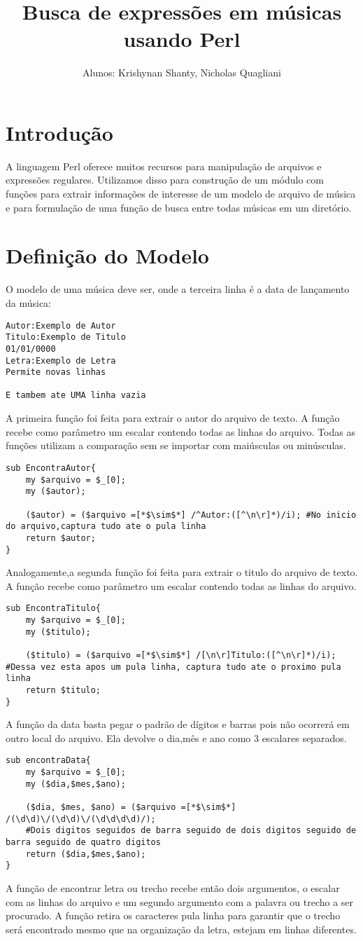 \documentclass[12pt]{article}
\title{Busca de expressões em músicas usando Perl}
\author{Alunos: Krishynan Shanty, Nicholas Quagliani}
\begin{document}
\maketitle

\section{Introdução}
A linguagem Perl oferece muitos recursos para manipulação de arquivos e expressões regulares. Utilizamos disso para construção de um módulo com funções para extrair informações de interesse de um modelo de arquivo de música e para formulação de uma função de busca entre todas músicas em um diretório.
\section{Definição do Modelo}
O modelo de uma música deve ser, onde a terceira linha é a data de lançamento da música:
\begin{lstlisting}
Autor:Exemplo de Autor
Titulo:Exemplo de Titulo
01/01/0000
Letra:Exemplo de Letra
Permite novas linhas

E tambem ate UMA linha vazia
\end{lstlisting}
A primeira função foi feita para extrair o autor do arquivo de texto. A função recebe como parâmetro um escalar contendo todas as linhas do arquivo. Todas as funções utilizam a comparação sem se importar com maiúsculas ou minúsculas.
\begin{lstlisting}
sub EncontraAutor{
	my $arquivo = $_[0];
	my ($autor);
	
	($autor) = ($arquivo =[*$\sim$*] /^Autor:([^\n\r]*)/i); #No inicio do arquivo,captura tudo ate o pula linha
	return $autor;
}
\end{lstlisting}
Analogamente,a segunda função foi feita para extrair o titulo do arquivo de texto. A função recebe como parâmetro um escalar contendo todas as linhas do arquivo. \\
\begin{lstlisting}
sub EncontraTitulo{
	my $arquivo = $_[0];
	my ($titulo);
	
	($titulo) = ($arquivo =[*$\sim$*] /[\n\r]Titulo:([^\n\r]*)/i); #Dessa vez esta apos um pula linha, captura tudo ate o proximo pula linha
	return $titulo;
}
\end{lstlisting}
A função da data basta pegar o padrão de dígitos e barras pois não ocorrerá em outro local do arquivo. Ela devolve o dia,mês e ano como 3 escalares separados.
\begin{lstlisting}
sub encontraData{
	my $arquivo = $_[0];
	my ($dia,$mes,$ano);
	
	($dia, $mes, $ano) = ($arquivo =[*$\sim$*] /(\d\d)\/(\d\d)\/(\d\d\d\d)/);
	#Dois digitos seguidos de barra seguido de dois digitos seguido de barra seguido de quatro digitos
	return ($dia,$mes,$ano);
}
\end{lstlisting}
A função de encontrar letra ou trecho recebe então dois argumentos, o escalar com as linhas do arquivo e um segundo argumento com a palavra ou trecho a ser procurado. A função retira os caracteres pula linha para garantir que o trecho será encontrado mesmo que na organização da letra, estejam em linhas diferentes.
\end{document}
